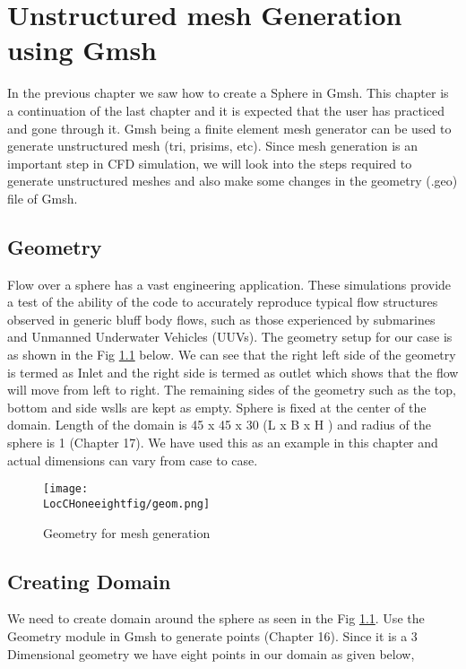 \chapter{Unstructured mesh Generation using Gmsh}
\thispagestyle{empty}
\label{sec:chap18}
\newcommand{\LocCHoneeightfig}{\Origin/CHAPTERS/chap18/figures}

In the previous chapter we saw how to create a Sphere in Gmsh. This chapter is a continuation of the last chapter and it is expected that the user has practiced and gone through it. Gmsh being a finite element mesh generator can be used to generate unstructured mesh (tri, prisims, etc). Since mesh generation is an important step in CFD simulation, we will look into the steps required to generate unstructured meshes and also make some changes in the geometry (.geo) file of Gmsh.

\section{Geometry}

Flow over a sphere has a vast engineering application. These simulations provide a test of the ability of the code to accurately reproduce typical flow structures observed in generic bluff body flows, such as those experienced by submarines and Unmanned Underwater Vehicles (UUVs). The geometry setup for our case is as shown in the Fig \ref{geom} below. We can see that the right left side of the geometry is termed as Inlet and the right side is termed as outlet which shows that the flow will move from left to right. The remaining sides of the geometry such as the top, bottom and side wslls are kept as empty. Sphere is fixed at the center of the domain. Length of the domain is 45 x 45 x 30 (L x B x H ) and radius of the sphere is 1 (Chapter 17). We have used this as an example in this chapter and actual dimensions can vary from case to case.
    
\begin{figure}[h]  
\centering
\texttt{[image: \\LocCHoneeightfig/geom.png]}
\caption{Geometry for mesh generation}
\label{geom}
\end{figure}
    
\section{Creating Domain}

We need to create domain around the sphere as seen in the Fig \ref{geom}. Use the Geometry module in Gmsh to generate points (Chapter 16). Since it is a 3 Dimensional geometry we have eight points in our domain as given below,

